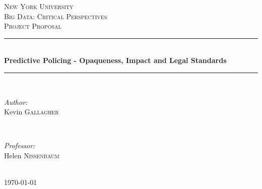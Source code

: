 \documentclass[12pt]{article} %
\begin{document}

\begin{titlepage}

\newcommand{\HRule}{\rule{\linewidth}{0.5mm}} %

\center %

\textsc{\LARGE New York University}\\[1.5cm] %
\textsc{\Large Big Data: Critical Perspectives}\\[0.5cm] %
\textsc{\large Project Proposal}\\[0.5cm] %

\HRule \\[0.4cm]
{ \huge \bfseries Predictive Policing - Opaqueness, Impact and Legal Standards}\\[0.4cm] %
\HRule \\[1.5cm]

\begin{minipage}{0.4\textwidth}
\begin{flushleft} \large
\emph{Author:}\\
Kevin \textsc{Gallagher} %
\end{flushleft}
\end{minipage}
~
\begin{minipage}{0.4\textwidth}
\begin{flushright} \large
\emph{Professor:} \\
Helen \textsc{Nissenbaum} %
\end{flushright}
\end{minipage}\\[4cm]

{\large \today}\\[3cm] %


\vfill %

\end{titlepage}
\end{document}
